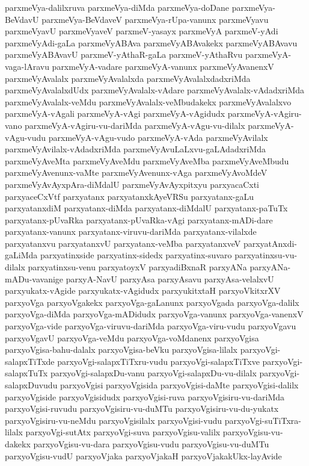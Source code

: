 {parxmeVya-dalilxruva
parxmeVya-diMda
parxmeVya-doDane
parxmeVya-BeVdavU
parxmeVya-BeVdaveV
parxmeVya-rUpa-vanunx
parxmeVyavu
parxmeVyavU
parxmeVyaveV
parxmeV-yasayx
parxmeVyA
parxmeV-yAdi
parxmeVyAdi-gaLa
parxmeVyABAva
parxmeVyABAvakekx
parxmeVyABAvavu
parxmeVyABAvavU
parxmeV-yAthaR-gaLa
parxmeV-yAthaRvu
parxmeVyA-vaga-lAravu
parxmeVyA-vadare
parxmeVyA-vanunx
parxmeVyAvanenxV
parxmeVyAvalalx
parxmeVyAvalalxda
parxmeVyAvalalxdadxriMda
parxmeVyAvalalxdUdx
parxmeVyAvalalx-vAdare
parxmeVyAvalalx-vAdadxriMda
parxmeVyAvalalx-veMdu
parxmeVyAvalalx-veMbudakekx
parxmeVyAvalalxvo
parxmeVyA-vAgali
parxmeVyA-vAgi
parxmeVyA-vAgidudx
parxmeVyA-vAgiru-vano
parxmeVyA-vAgiru-vu-dariMda
parxmeVyA-vAgu-vu-dilalx
parxmeVyA-vAgu-vudu
parxmeVyA-vAgu-vudo
parxmeVyA-vAda
parxmeVyAvilalx
parxmeVyAvilalx-vAdadxriMda
parxmeVyAvuLaLxvu-gaLAdadxriMda
parxmeVyAveMta
parxmeVyAveMdu
parxmeVyAveMba
parxmeVyAveMbudu
parxmeVyAvenunx-vaMte
parxmeVyAvenunx-vAga
parxmeVyAvoMdeV
parxmeVyAvAyxpAra-diMdalU
parxmeVyAvAyxpitxyu
parxyacaCxti
parxyaceCxVtf
parxyatanx
parxyatanxkAyeVRSu
parxyatanx-gaLu
parxyatanxdiM
parxyatanx-diMda
parxyatanx-diMdalU
parxyatanx-paTuTx
parxyatanx-pUvaRka
parxyatanx-pUvaRka-vAgi
parxyatanx-mADi-dare
parxyatanx-vanunx
parxyatanx-viruvu-dariMda
parxyatanx-vilalxde
parxyatanxvu
parxyatanxvU
parxyatanx-veMba
parxyatanxveV
parxyatAnxdi-gaLiMda
parxyatinxside
parxyatinx-sidedx
parxyatinx-suvaro
parxyatinxsu-vu-dilalx
parxyatinxsu-venu
parxyatoyxV
parxyadiBxnaR
parxyANa
parxyANa-mADu-vavanige
parxyA-NavU
parxyAsa
parxyAsavu
parxyAsa-velalxvU
parxyukatx-vAgide
parxyukatx-vAgidudx
parxyukitxtaH
parxyoVkitxrXV
parxyoVga
parxyoVgakekx
parxyoVga-gaLanunx
parxyoVgada
parxyoVga-dalilx
parxyoVga-diMda
parxyoVga-mADidudx
parxyoVga-vanunx
parxyoVga-vanenxV
parxyoVga-vide
parxyoVga-viruvu-dariMda
parxyoVga-viru-vudu
parxyoVgavu
parxyoVgavU
parxyoVga-veMdu
parxyoVga-voMdanenx
parxyoVgisa
parxyoVgisa-bahu-dalalx
parxyoVgisa-beVku
parxyoVgisa-lilalx
parxyoVgi-salapxTiTxde
parxyoVgi-salapxTiTxru-vudu
parxyoVgi-salapxTiTxve
parxyoVgi-salapxTuTx
parxyoVgi-salapxDu-vanu
parxyoVgi-salapxDu-vu-dilalx
parxyoVgi-salapxDuvudu
parxyoVgisi
parxyoVgisida
parxyoVgisi-daMte
parxyoVgisi-dalilx
parxyoVgiside
parxyoVgisidudx
parxyoVgisi-ruva
parxyoVgisiru-vu-dariMda
parxyoVgisi-ruvudu
parxyoVgisiru-vu-duMTu
parxyoVgisiru-vu-du-yukatx
parxyoVgisiru-vu-neMdu
parxyoVgisilalx
parxyoVgisi-vudu
parxyoVgi-suTiTxra-lilalx
parxyoVgi-sutAtx
parxyoVgi-suva
parxyoVgisu-valilx
parxyoVgisu-vu-dakekx
parxyoVgisu-vu-dara
parxyoVgisu-vudu
parxyoVgisu-vu-duMTu
parxyoVgisu-vudU
parxyoVjaka
parxyoVjakaH
parxyoVjakakUkx-layAvide
}
